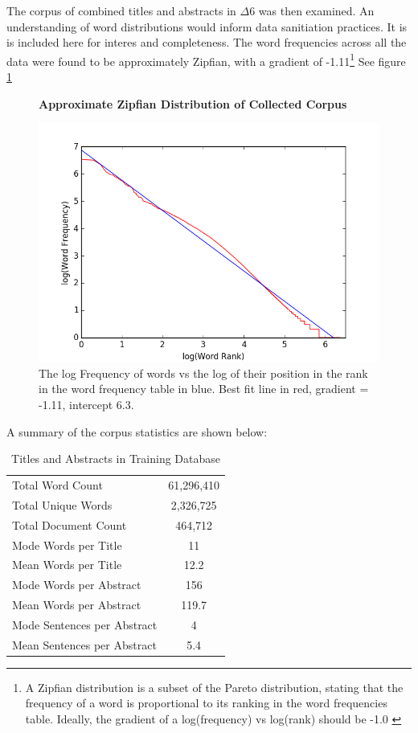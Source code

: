 The corpus of combined titles and abstracts in $\Delta6$ was then examined. An understanding of word distributions would inform data sanitiation practices. It is is included here for interes and completeness. The word frequencies across all the data were found to be approximately Zipfian, with a gradient of -1.11\footnote{A Zipfian distribution is a subset of the Pareto distribution, stating that the frequency of a word is proportional to its ranking in the word frequencies table. Ideally, the gradient of a log(frequency) vs log(rank) should be -1.0 \cite{zipf}} See figure \ref{fig:ZIPF}
\begin{figure}[H]
    \centering
    \textbf{Approximate Zipfian Distribution of Collected Corpus}\par\medskip
    \includegraphics[scale=0.6]{Data_Acquisition/zipf.png}
    \caption[Zipfian Plot of Collected Corpus]{The log Frequency of words vs the log of their position in the rank in the word frequency table in blue. Best fit line in red, gradient = -1.11, intercept 6.3. }
     \label{fig:ZIPF}
\end{figure}
A summary of the corpus statistics are shown below:
\begin{table}[h!]
\caption{Titles and Abstracts in Training Database}
\label{tab:CORPUS STATS}
\begin{center}
\begin{tabular}{||l|c||}
\hline
Total Word Count & 61,296,410\\
Total Unique Words & 2,326,725\\
Total Document Count & 464,712\\
Mode Words per Title &  11\\
Mean Words per Title &  12.2\\
Mode Words per Abstract & 156\\
Mean Words per Abstract & 119.7\\
Mode Sentences per Abstract & 4\\
Mean Sentences per Abstract & 5.4\\
\hline
\end{tabular}
\end{center}
\end{table}

